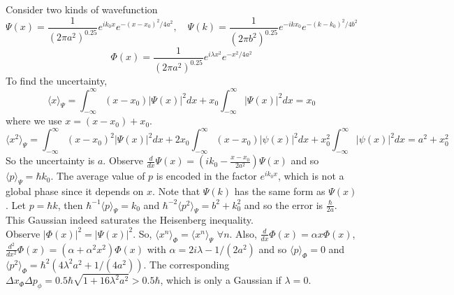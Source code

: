 \documentclass[a4paper]{article}
\begin{document}
\begin{eg}
Consider two kinds of wavefunction
$$\Psi(x)=\frac{1}{(2\pi a^2)^{0.25}}e^{ik_0x}e^{-(x-x_0)^2/4a^2},\quad\Psi(k)=\frac{1}{(2\pi b^2)^{0.25}}e^{-ikx_0}e^{-(k-k_0)^2/4b^2}$$
$$\Phi(x)=\frac{1}{(2\pi a^2)^{0.25}}e^{i\lambda x^2}e^{-x^2/4a^2}$$
To find the uncertainty,
$$\langle x\rangle_{\Psi}=\int_{-\infty}^\infty(x-x_0)|\Psi(x)|^2dx+x_0\int_{-\infty}^{\infty}|\Psi(x)|^2dx=x_0$$
where we use $x=(x-x_0)+x_0$.
$$\langle x^2\rangle_{\Psi}=\int_{-\infty}^\infty(x-x_0)^2|\Psi(x)|^2dx+2x_0\int_{-\infty}^\infty(x-x_0)|\psi(x)|^2dx+x_0^2\int_{-\infty}^\infty|\psi(x)|^2dx=a^2+x_0^2$$
So the uncertainty is $a$. Observe $\frac{d}{dx}\Psi(x)=(ik_0-\frac{x-x_0}{2a^2})\Psi(x)$ and so $\langle p\rangle_{\Psi}=\hbar k_0$. The average value of $p$ is encoded in the factor $e^{ik_0x}$, which is not a global phase since it depends on $x$. Note that $\Psi(k)$ has the same form as $\Psi(x)$. Let $p=\hbar k$, then $\hbar^{-1}\langle p\rangle_\Psi=k_0$ and $\hbar^{-2}\langle p^2\rangle_\Psi=b^2+k_0^2$ and so the error is $\frac{\hbar}{2a}$. This Gaussian indeed saturates the Heisenberg inequality.\\[5pt]
Observe $|\Phi(x)|^2=|\Psi(x)|^2$. So, $\langle x^n\rangle_\Phi=\langle x^n\rangle_\Psi$ $\forall n$. Also, $\frac{d}{dx}\Phi(x)=\alpha x\Phi(x)$, $\frac{d^2}{dx^2}\Phi(x)=(\alpha+\alpha^2x^2)\Phi(x)$ with $\alpha=2i\lambda-1/(2a^2)$ and so $\langle p\rangle_\Phi=0$ and $\langle p^2\rangle_\Phi=\hbar^2(4\lambda^2a^2+1/(4a^2))$. The corresponding $\Delta x_\Phi\Delta p_\phi=0.5\hbar\sqrt{1+16\lambda^2a^2}>0.5\hbar$, which is only a Gaussian if $\lambda=0$.
\end{eg}
\end{document}
